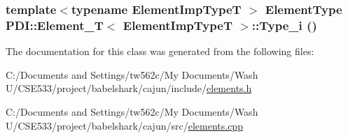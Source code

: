 \hypertarget{class_p_d_i_1_1_element___t_b26e3df50adb5f550ef5fe5ea90e5cdd}{
\subsubsection[{Type\_\-i}]{\setlength{\rightskip}{0pt plus 5cm}template$<$typename ElementImpTypeT $>$ {\bf ElementType} {\bf PDI::Element\_\-T}$<$ ElementImpTypeT $>$::Type\_\-i ()}}
\label{class_p_d_i_1_1_element___t_b26e3df50adb5f550ef5fe5ea90e5cdd}




The documentation for this class was generated from the following files:\begin{CompactItemize}
\item 
C:/Documents and Settings/tw562c/My Documents/Wash U/CSE533/project/babelshark/cajun/include/\hyperlink{elements_8h}{elements.h}\item 
C:/Documents and Settings/tw562c/My Documents/Wash U/CSE533/project/babelshark/cajun/src/\hyperlink{elements_8cpp}{elements.cpp}\end{CompactItemize}
